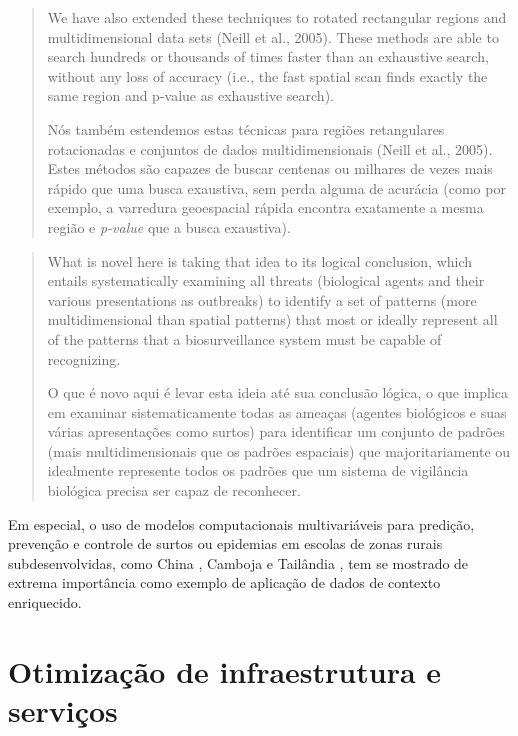 \begin{quote}
    We have also extended these techniques to rotated rectangular regions and multidimensional data sets (Neill et al., 2005). These methods are able to search hundreds or thousands of times faster than an exhaustive search, without any loss of accuracy (i.e., the fast spatial scan finds exactly the same region and p-value as exhaustive search).
    
    Nós também estendemos estas técnicas para regiões retangulares rotacionadas e conjuntos de dados multidimensionais (Neill et al., 2005). Estes métodos são capazes de buscar centenas ou milhares de vezes mais rápido que uma busca exaustiva, sem perda alguma de acurácia (como por exemplo, a varredura geoespacial rápida encontra exatamente a mesma região e \textit{p-value} que a busca exaustiva).
\end{quote}

\begin{quote}
    What is novel here is taking that idea to its logical conclusion, which entails systematically examining all threats (biological agents and their various presentations as outbreaks) to identify a set of patterns (more multidimensional than spatial patterns) that most or ideally represent all of the patterns that a biosurveillance system must be capable of recognizing.
    
    O que é novo aqui é levar esta ideia até sua conclusão lógica, o que implica em examinar sistematicamente todas as ameaças (agentes biológicos e suas várias apresentações como surtos) para identificar um conjunto de padrões (mais multidimensionais que os padrões espaciais) que majoritariamente ou idealmente represente todos os padrões que um sistema de vigilância biológica precisa ser capaz de reconhecer.
\end{quote}

Em especial, o uso de modelos computacionais multivariáveis para predição, prevenção e controle de surtos ou epidemias em escolas de zonas rurais subdesenvolvidas, como China \cite{pilot2014syndromic}, Camboja \cite{cheng2013potential} e Tailândia \cite{lawpoolsri2014real}, tem se mostrado de extrema importância como exemplo de aplicação de dados de contexto enriquecido.

\section{Otimização de infraestrutura e serviços}

